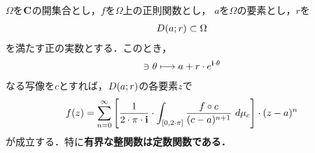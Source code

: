 	\begin{screen}
		\begin{thm}[Liouvilleの定理]\label{thm:Liouville_theorem}
			$\Omega$を$\mathbf{C}$の開集合とし，$f$を$\Omega$上の正則関数とし，
			$a$を$\Omega$の要素とし，$r$を
			\begin{align}
				D(a;r) \subset \Omega
			\end{align}
			を満たす正の実数とする．このとき，
			\begin{align}
				[0,2\cdot\pi] \ni \theta \longmapsto a + r \cdot e^{\isym \cdot \theta}
			\end{align}
			なる写像を$c$とすれば，$D(a;r)$の各要素$z$で
			\begin{align}
				f(z) = \sum_{n=0}^{\infty} \left[ \frac{1}{2\cdot\pi\cdot\mathbf{i}} \cdot \int_{[0,2\cdot\pi]} \frac{f \circ c}{(c - a)^{n+1}}\ d\mu_{c} \right] \cdot (z-a)^{n}
			\end{align}
			が成立する．特に{\bf 有界な整関数は定数関数である．}
		\end{thm}
	\end{screen}
	
